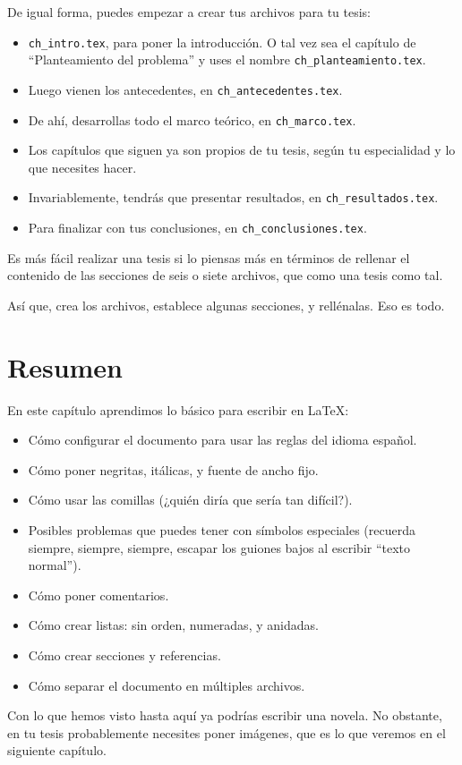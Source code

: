 De igual forma, puedes empezar a crear tus archivos para tu tesis:
\begin{itemize}
	\item \texttt{ch\_intro.tex}, para poner la introducción. O tal vez sea el capítulo de ``Planteamiento del problema'' y uses el nombre \texttt{ch\_planteamiento.tex}.
	\item Luego vienen los antecedentes, en \texttt{ch\_antecedentes.tex}.
	\item De ahí, desarrollas todo el marco teórico, en \texttt{ch\_marco.tex}.
	\item Los capítulos que siguen ya son propios de tu tesis, según tu especialidad y lo que necesites hacer.
	\item Invariablemente, tendrás que presentar resultados, en \texttt{ch\_resultados.tex}.
	\item Para finalizar con tus conclusiones, en \texttt{ch\_conclusiones.tex}.
\end{itemize}

Es más fácil realizar una tesis si lo piensas más en términos de rellenar el contenido de las secciones de seis o siete archivos, que como una tesis como tal.

Así que, crea los archivos, establece algunas secciones, y rellénalas. Eso es todo.



\newpage
\section*{Resumen}



\noindent En este capítulo aprendimos lo básico para escribir en \LaTeX{}:
\begin{itemize}
  \item Cómo configurar el documento para usar las reglas del idioma español.
	\item Cómo poner negritas, itálicas, y fuente de ancho fijo.
	\item Cómo usar las comillas (¿quién diría que sería tan difícil?).
	\item Posibles problemas que puedes tener con símbolos especiales (recuerda siempre, siempre, siempre, escapar los guiones bajos al escribir ``texto normal'').
	\item Cómo poner comentarios.
	\item Cómo crear listas: sin orden, numeradas, y anidadas.
	\item Cómo crear secciones y referencias.
	\item Cómo separar el documento en múltiples archivos.
\end{itemize}

Con lo que hemos visto hasta aquí ya podrías escribir una novela. No obstante, en tu tesis probablemente necesites poner imágenes, que es lo que veremos en el siguiente capítulo.